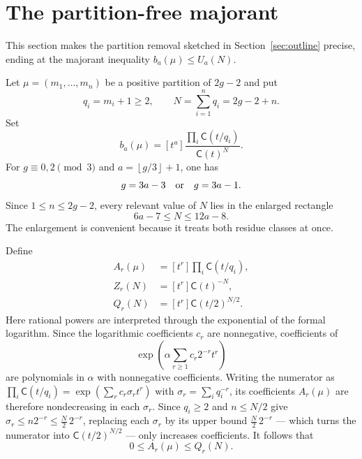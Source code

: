 \documentclass[11pt]{article}
\theoremstyle{definition}
\theoremstyle{remark}
\newcommand{\C}{\mathsf C}
\newcommand{\floor}[1]{\left\lfloor #1\right\rfloor}
\begin{document}
\section{The partition-free majorant}\label{sec:majorant}

This section makes the partition removal sketched in Section~\ref{sec:outline}
precise, ending at the majorant inequality $b_a(\mu)\le U_a(N)$.

Let $\mu=(m_1,\ldots,m_n)$ be a positive partition of $2g-2$ and put
\begin{equation}\label{eq:qN}
  q_i=m_i+1\ge2,
  \qquad
  N=\sum_{i=1}^nq_i=2g-2+n.
\end{equation}
Set
\begin{equation}\label{eq:bdef}
  b_a(\mu)=[t^a]\frac{\prod_i\C(t/q_i)}{\C(t)^N}.
\end{equation}
For $g\equiv0,2\pmod3$ and $a=\floor{g/3}+1$, one has
\[
  g=3a-3\quad\hbox{or}\quad g=3a-1.
\]
Since $1\le n\le2g-2$, every relevant value of $N$ lies in the enlarged
rectangle
\begin{equation}\label{eq:rectangle}
  6a-7\le N\le12a-8.
\end{equation}
The enlargement is convenient because it treats both residue classes at once.

Define
\begin{equation}\label{eq:AZQ}
\begin{split}
 A_r(\mu)&=[t^r]\prod_i\C(t/q_i),\\
 Z_r(N)&=[t^r]\C(t)^{-N},\\
 Q_r(N)&=[t^r]\C(t/2)^{N/2}.
\end{split}
\end{equation}
Here rational powers are interpreted through the exponential of the formal
logarithm.  Since the logarithmic coefficients $c_r$ are nonnegative,
coefficients of
\[
  \exp\left(\alpha\sum_{r\ge1}c_r2^{-r}t^r\right)
\]
are polynomials in $\alpha$ with nonnegative coefficients.  Writing the
numerator as $\prod_i\C(t/q_i)=\exp(\sum_rc_r\sigma_rt^r)$ with
$\sigma_r=\sum_iq_i^{-r}$, its coefficients $A_r(\mu)$ are therefore nondecreasing
in each $\sigma_r$.  Since $q_i\ge2$ and $n\le N/2$ give
$\sigma_r\le n2^{-r}\le\tfrac N2\,2^{-r}$, replacing each $\sigma_r$ by its upper bound
$\tfrac N2\,2^{-r}$ --- which turns the numerator into $\C(t/2)^{N/2}$ --- only
increases coefficients.  It follows that
\begin{equation}\label{eq:PleQ}
  0\le A_r(\mu)\le Q_r(N).
\end{equation}
\end{document}
